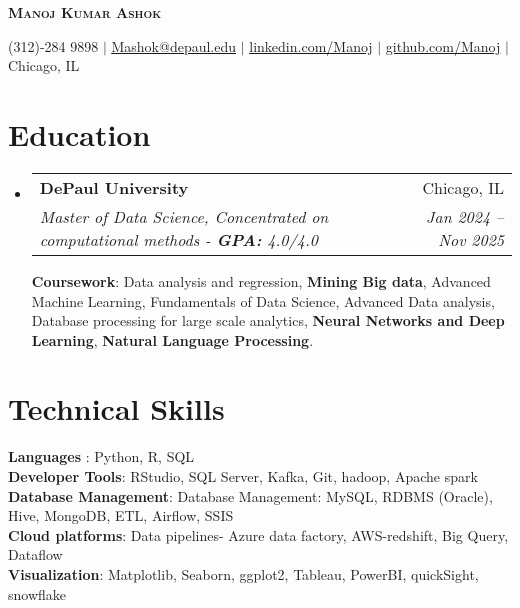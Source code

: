 \documentclass[letterpaper,11pt]{article}
\makeatletter
\newcommand{\resumeSubheading}[4]{
  \vspace{-2pt}\item
    \begin{tabular*}{0.97\textwidth}[t]{l@{\extracolsep{\fill}}r}
      \textbf{#1} & #2 \\
      \textit{\small#3} & \textit{\small #4} \\
    \end{tabular*}\vspace{-7pt}
}
\newcommand{\resumeSubHeadingListStart}{\begin{itemize}[leftmargin=0.15in, label={}]}
\newcommand{\resumeSubHeadingListEnd}{\end{itemize}}
\makeatother
\begin{document}

\begin{center}
    \textbf{\Huge \scshape Manoj Kumar Ashok} \\ \vspace{1pt}
     
    \small (312)-284 9898 $|$ \href{mailto:mashok@depaul.edu}{\underline{Mashok@depaul.edu}} $|$ 
    \href{https://www.linkedin.com/in/manoj-kumar-ashok-078241211/}{\underline{linkedin.com/Manoj}} $|$
    \href{https://github.com/MK-Github03}{\underline{github.com/Manoj}} $|$ \small Chicago, IL 
\end{center}


\section{Education}
  \resumeSubHeadingListStart
 
    \resumeSubheading
      {DePaul University}{Chicago, IL}
      {Master of Data Science, Concentrated on computational methods - \textbf{GPA:} 4.0/4.0}{Jan 2024 -- Nov 2025  }
       \vspace{0.1em}
      
      {\textbf{Coursework}: Data analysis and regression, \textbf{Mining Big data}, Advanced Machine Learning, Fundamentals of Data Science, Advanced Data analysis, Database processing for large scale analytics, \textbf{Neural Networks and Deep Learning}, \textbf{Natural Language Processing}. }
    
  \resumeSubHeadingListEnd
\section{Technical Skills}
 \begin{itemize}[leftmargin=0.15in, label={}]
    \small{\item{
     \textbf{Languages }{: Python, R, SQL} \\
     \textbf{Developer Tools}{: RStudio, SQL Server, Kafka, Git, hadoop, Apache spark } \\
     \textbf{Database Management}{: Database Management: MySQL, RDBMS (Oracle), Hive, MongoDB, ETL, Airflow, SSIS }\\
     \textbf{Cloud platforms}{: Data pipelines- Azure data factory, AWS-redshift, Big Query, Dataflow}\\
     \textbf{Visualization}{: Matplotlib, Seaborn, ggplot2, Tableau, PowerBI, quickSight, snowflake }
    }}
 \end{itemize}
\end{document}
